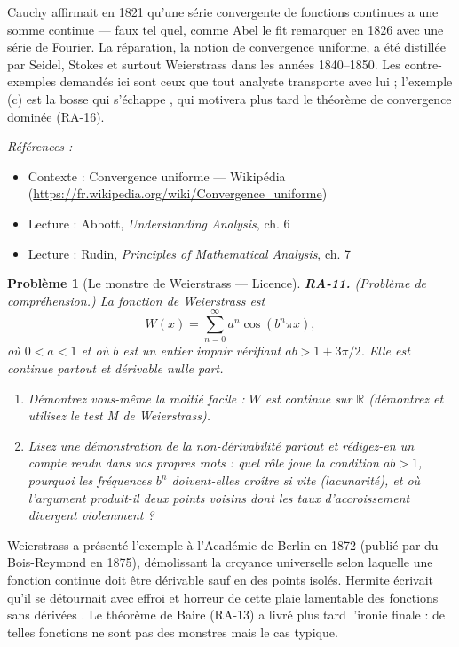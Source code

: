 \documentclass[11pt]{article}
\newtheorem{problem}{Problème}
\newenvironment{refs}{\par\small\noindent\emph{Références :}\begin{itemize}\setlength\itemsep{0pt}}{\end{itemize}\normalsize}
\begin{document}
\noindent Cauchy affirmait en 1821 qu'une série convergente de fonctions continues a une
somme continue --- faux tel quel, comme Abel le fit remarquer en 1826 avec une série de Fourier. La
réparation, la notion de convergence uniforme, a été distillée par Seidel, Stokes et surtout
Weierstrass dans les années 1840--1850. Les contre-exemples demandés ici sont ceux que tout analyste
transporte avec lui ; l'exemple (c) est la \og{} bosse qui s'échappe \fg{}, qui motivera plus tard le
théorème de convergence dominée (RA-16).

\begin{refs}
\item Contexte : Convergence uniforme --- Wikipédia (\url{https://fr.wikipedia.org/wiki/Convergence_uniforme})
\item Lecture : Abbott, \textit{Understanding Analysis}, ch. 6
\item Lecture : Rudin, \textit{Principles of Mathematical Analysis}, ch. 7
\end{refs}

\bigskip

\begin{problem}[{Le monstre de Weierstrass --- Licence}]
\textbf{RA-11.} (Problème de compréhension.) La fonction de Weierstrass est
\[ W(x) = \sum_{n=0}^{\infty} a^n \cos(b^n \pi x), \]
où $ 0 < a < 1 $ et où $ b $ est un entier impair vérifiant $ ab > 1 + 3\pi/2 $. Elle
est continue partout et dérivable nulle part.
\begin{enumerate}
\item[(a)] Démontrez vous-même la moitié facile : $ W $ est
continue sur $ \mathbb{R} $ (démontrez et utilisez le test M de Weierstrass).
\item[(b)] Lisez une démonstration de la non-dérivabilité partout et rédigez-en un compte rendu dans vos
propres mots : quel rôle joue la condition $ ab > 1 $, pourquoi les fréquences $ b^n $
doivent-elles croître si vite (lacunarité), et où l'argument produit-il deux points voisins dont les
taux d'accroissement divergent violemment ?
\end{enumerate}

\end{problem}

\noindent Weierstrass a présenté l'exemple à l'Académie de Berlin en 1872 (publié par du
Bois-Reymond en 1875), démolissant la croyance universelle selon laquelle une fonction continue doit
être dérivable sauf en des points isolés. Hermite écrivait qu'il se détournait \og{} avec effroi et
horreur de cette plaie lamentable des fonctions sans dérivées \fg{}. Le théorème de Baire (RA-13) a
livré plus tard l'ironie finale : de telles fonctions ne sont pas des monstres mais le cas
typique.
\end{document}
